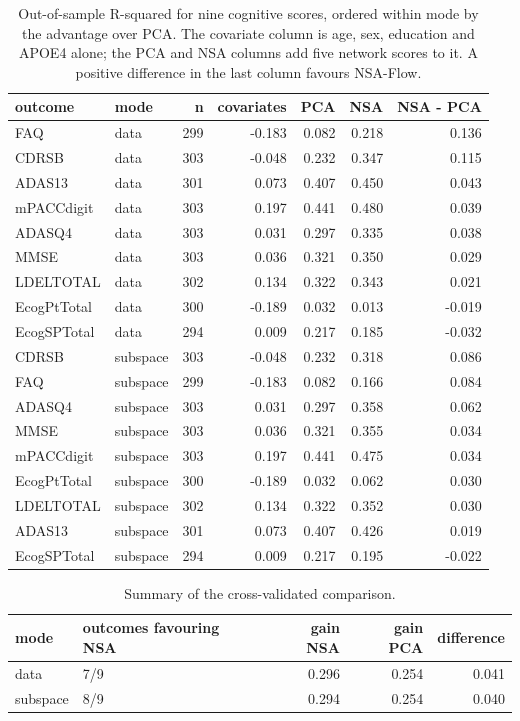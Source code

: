 \documentclass[
]{article}
\begin{document}
\begin{table}[!h]
\centering
\caption{\label{tab:cogcv}Out-of-sample R-squared for nine cognitive scores, ordered within mode by the advantage over PCA. The covariate column is age, sex, education and APOE4 alone; the PCA and NSA columns add five network scores to it. A positive difference in the last column favours NSA-Flow.}
\centering
\fontsize{9}{11}\selectfont
\begin{tabular}[t]{llrrrrr}
\toprule
outcome & mode & n & covariates & PCA & NSA & NSA - PCA\\
\midrule
FAQ & data & 299 & -0.183 & 0.082 & 0.218 & 0.136\\
CDRSB & data & 303 & -0.048 & 0.232 & 0.347 & 0.115\\
ADAS13 & data & 301 & 0.073 & 0.407 & 0.450 & 0.043\\
mPACCdigit & data & 303 & 0.197 & 0.441 & 0.480 & 0.039\\
ADASQ4 & data & 303 & 0.031 & 0.297 & 0.335 & 0.038\\
MMSE & data & 303 & 0.036 & 0.321 & 0.350 & 0.029\\
LDELTOTAL & data & 302 & 0.134 & 0.322 & 0.343 & 0.021\\
EcogPtTotal & data & 300 & -0.189 & 0.032 & 0.013 & -0.019\\
EcogSPTotal & data & 294 & 0.009 & 0.217 & 0.185 & -0.032\\
CDRSB & subspace & 303 & -0.048 & 0.232 & 0.318 & 0.086\\
FAQ & subspace & 299 & -0.183 & 0.082 & 0.166 & 0.084\\
ADASQ4 & subspace & 303 & 0.031 & 0.297 & 0.358 & 0.062\\
MMSE & subspace & 303 & 0.036 & 0.321 & 0.355 & 0.034\\
mPACCdigit & subspace & 303 & 0.197 & 0.441 & 0.475 & 0.034\\
EcogPtTotal & subspace & 300 & -0.189 & 0.032 & 0.062 & 0.030\\
LDELTOTAL & subspace & 302 & 0.134 & 0.322 & 0.352 & 0.030\\
ADAS13 & subspace & 301 & 0.073 & 0.407 & 0.426 & 0.019\\
EcogSPTotal & subspace & 294 & 0.009 & 0.217 & 0.195 & -0.022\\
\bottomrule
\end{tabular}
\end{table}

\begin{table}[!h]
\centering
\caption{\label{tab:cogcvsummary}Summary of the cross-validated comparison.}
\centering
\fontsize{9}{11}\selectfont
\begin{tabular}[t]{llrrr}
\toprule
mode & outcomes favouring NSA & gain NSA & gain PCA & difference\\
\midrule
data & 7/9 & 0.296 & 0.254 & 0.041\\
subspace & 8/9 & 0.294 & 0.254 & 0.040\\
\bottomrule
\end{tabular}
\end{table}
\end{document}
